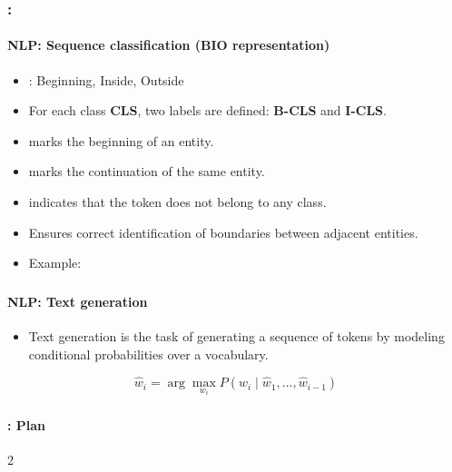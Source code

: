 \documentclass[xcolor=table]{beamer}
\begin{document}
\begin{frame}
	\frametitle{\insertshortsubtitle: \insertsection}
	\framesubtitle{NLP: Sequence classification (BIO representation)}
	
	\begin{itemize}
		\item {}: Beginning, Inside, Outside
		
		\item For each class \textbf{CLS}, two labels are defined: \textbf{B-CLS} and \textbf{I-CLS}.
		
		\item {} marks the beginning of an entity.
		
		\item {} marks the continuation of the same entity.
		
		\item {} indicates that the token does not belong to any class.
		
		\item Ensures correct identification of boundaries between adjacent entities.
		
		\item Example: 
	\end{itemize}
\end{frame}


\begin{frame}
	\frametitle{\inserttitle}
	\framesubtitle{NLP: Text generation}
	
	\begin{itemize}
		\item Text generation is the task of generating a sequence of tokens by modeling conditional probabilities over a vocabulary.
	\end{itemize}
	
	\[
	\hat{w}_i = \arg\max_{w_i} P(w_i \mid \hat{w}_1, \dots, \hat{w}_{i-1})
	\]
	
\end{frame}


\begin{frame}
	\frametitle{\inserttitle}
	\framesubtitle{\insertshortsubtitle: Plan}
	
	\begin{multicols}{2}
		\small
		\tableofcontents
	\end{multicols}
\end{frame}
\end{document}
